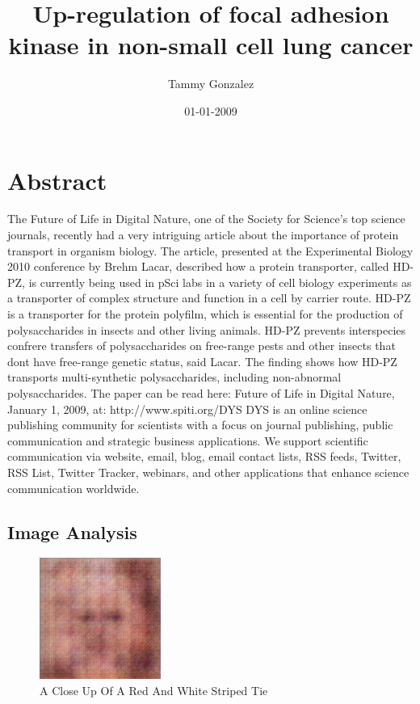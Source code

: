 \documentclass{article}%
\title{Up{-}regulation of focal adhesion kinase in non{-}small cell lung cancer}%
\author{Tammy Gonzalez}%
\affil{Department of Developmental, Molecular and Chemical Biology, Tufts University School of Medicine, Boston, Massachusetts, United States of America}%
\date{01{-}01{-}2009}%
\begin{document}
%
\normalsize%
\maketitle%
\section{Abstract}%
\label{sec:Abstract}%
The Future of Life in Digital Nature, one of the Society for Science's top science journals, recently had a very intriguing article about the importance of protein transport in organism biology. The article, presented at the Experimental Biology 2010 conference by Brehm Lacar, described how a protein transporter, called HD{-}PZ, is currently being used in pSci labs in a variety of cell biology experiments as a transporter of complex structure and function in a cell by carrier route.\newline%
HD{-}PZ is a transporter for the protein polyfilm, which is essential for the production of polysaccharides in insects and other living animals. HD{-}PZ prevents interspecies confrere transfers of polysaccharides on free{-}range pests and other insects that dont have free{-}range genetic status, said Lacar. The finding shows how HD{-}PZ transports multi{-}synthetic polysaccharides, including non{-}abnormal polysaccharides.\newline%
The paper can be read here:\newline%
Future of Life in Digital Nature, January 1, 2009, at: http://www.spiti.org/DYS\newline%
DYS is an online science publishing community for scientists with a focus on journal publishing, public communication and strategic business applications. We support scientific communication via website, email, blog, email contact lists, RSS feeds, Twitter, RSS List, Twitter Tracker, webinars, and other applications that enhance science communication worldwide.

%
\subsection{Image Analysis}%
\label{subsec:ImageAnalysis}%


\begin{figure}[h!]%
\centering%
\includegraphics[width=150px]{500_fake_images/samples_5_399.png}%
\caption{A Close Up Of A Red And White Striped Tie}%
\end{figure}

%
\end{document}
